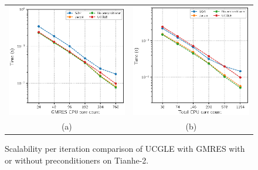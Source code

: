 \begin{figure}[t]
	\centering
	\begin{tabular}{cc}
		\includegraphics[width=.48\linewidth]{fig/scalable.eps}
		&\includegraphics[width=.48\linewidth]{fig/scalable_complet.eps} \\[\abovecaptionskip]
		\small (a)& (b) 
	\end{tabular}
	\caption{Scalability per iteration comparison of UCGLE with GMRES with or without preconditioners on Tianhe-2.}\label{fig:myfig}
\end{figure}

